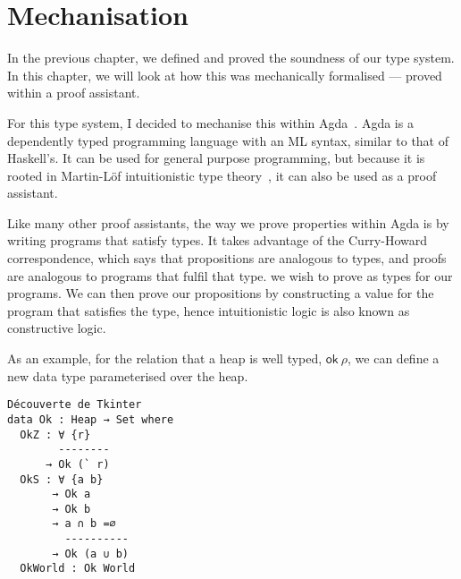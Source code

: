 \chapter{Mechanisation}\label{cha:mechanisation}

In the previous chapter, we defined and proved the soundness of our
type system. In this chapter, we will look at how this was
mechanically formalised --- proved within a proof assistant.

For this type system, I decided to mechanise this within
Agda~\cite{norell2009}. Agda is a dependently typed programming
language with an ML syntax, similar to that of Haskell's. It can be
used for general purpose programming, but because it is rooted in
Martin-Löf intuitionistic type theory~\cite{martin-lof1984}, it can
also be used as a proof assistant.

Like many other proof assistants, the way we prove properties within
Agda is by writing programs that satisfy types. It takes advantage of the
Curry-Howard correspondence, which says that propositions are
analogous to types, and proofs are analogous to programs that fulfil
that type.
we wish to prove as types for our programs. We can then prove our
propositions by constructing a value for the program that satisfies the
type, hence intuitionistic logic is also known as constructive logic.

As an example, for the relation that a heap is well typed,
$\textsf{ok} \ \rho$, we can define a new data type parameterised over the
heap.

\setmonofont{CMU Typewriter Text}

\begin{verbatim}
Découverte de Tkinter
data Ok : Heap → Set where
  OkZ : ∀ {r}
        --------
      → Ok (` r)
  OkS : ∀ {a b}
       → Ok a
       → Ok b
       → a ∩ b =∅
         ----------
       → Ok (a ∪ b)
  OkWorld : Ok World
\end{verbatim}